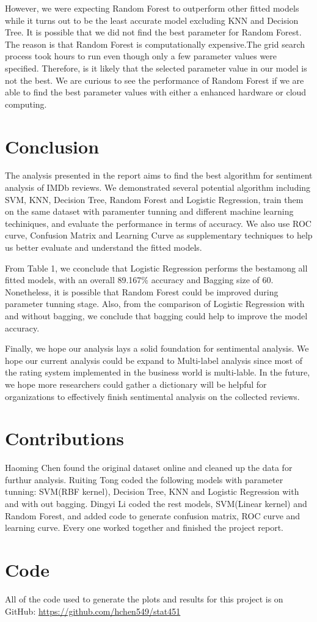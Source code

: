 \documentclass[10pt,twocolumn,letterpage]{article}
\begin{document}
	However, we were expecting Random Forest to outperform other fitted models while it turns out to be the least accurate model excluding KNN and Decision Tree. It is possible that we did not find the best parameter for Random Forest. The reason is that Random Forest is computationally expensive.The grid search process took hours to run even though only a few parameter values were specified. Therefore, is it likely that the selected parameter value in our model is not the best. We are curious to see the performance of Random Forest if we are able to find the best parameter values with either a enhanced hardware or cloud computing.
	
\section{Conclusion}
	The analysis presented in the report aims to find the best algorithm for sentiment analysis of IMDb reviews. We demonstrated several potential algorithm including SVM, KNN, Decision Tree, Random Forest and Logistic Regression, train them on the same dataset with paramenter tunning and different machine learning techiniques, and evaluate the performance in terms of accuracy. We also use ROC curve, Confusion Matrix and Learning Curve as supplementary techniques to help us better evaluate and understand the fitted models.

	From Table 1, we cconclude that Logistic Regression performs the bestamong all fitted models, with an overall 89.167\% accuracy and Bagging size of 60. Nonetheless, it is possible that Random Forest could be improved during parameter tunning stage. Also, from the comparison of Logistic Regression with and without bagging, we conclude that bagging could help to improve the model accuracy.

	Finally, we hope our analysis lays a solid foundation for sentimental analysis. We hope our current analysis could be expand to Multi-label analysis since most of the rating system implemented in the business world is multi-lable. In the future, we hope more researchers could gather a dictionary will be helpful for organizations to effectively finish sentimental analysis on the collected reviews.

	

	\section{Contributions}
	Haoming Chen found the original dataset online and cleaned up the data for furthur analysis. Ruiting Tong coded the following models with parameter tunning: SVM(RBF kernel), Decision Tree, KNN and Logistic Regression with and with out bagging. Dingyi Li coded the rest models, SVM(Linear kernel) and Random Forest, and added code to generate confusion matrix, ROC curve and learning curve. Every one worked together and finished the project report.
	\section{Code}
	All of the code used to generate the plots and results for this project is on GitHub: \url{https://github.com/hchen549/stat451}

		
	
\end{document}
